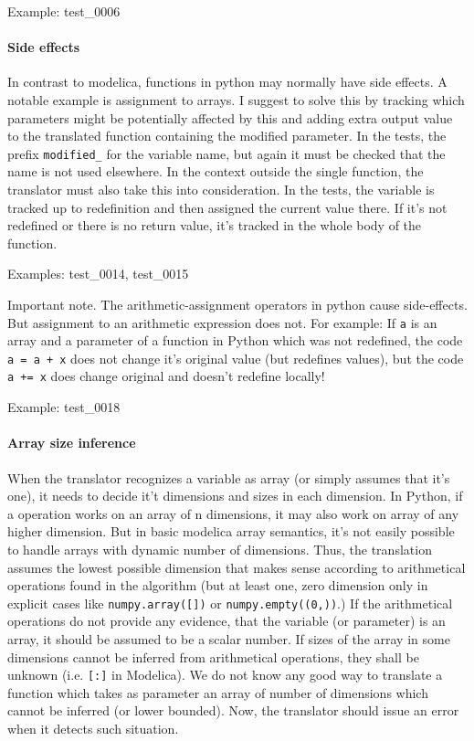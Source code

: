 \documentclass[a4paper,10pt]{article}
\begin{document}
Example: test\_0006

\paragraph{Side effects}
In contrast to modelica, functions in python may normally have side effects. A notable example is assignment to arrays.
I suggest to solve this by tracking which parameters might be potentially affected by this and adding extra
output value to the translated function containing the modified parameter.
In the tests, the prefix {\tt modified\_} for the variable name, but again it must be checked that the name is not used
elsewhere.
In the context outside the single function, the translator must also take this into consideration.
In the tests, the variable is tracked up to redefinition and then assigned the current value there. If it's not redefined
or there is no return value, it's tracked in the whole body of the function.

Examples: test\_0014, test\_0015

Important note. The arithmetic-assignment operators in python cause side-effects. But assignment to an arithmetic expression
does not. For example:
If {\tt a} is an array and a parameter of a function in Python which was not redefined, the code {\tt a = a + x} does not
change it's original value (but redefines values), but the code {\tt a += x} does change original and doesn't redefine locally!

Example: test\_0018


\paragraph{Array size inference}
When the translator recognizes a variable as array (or simply assumes that it's one), it needs to decide it't dimensions 
and sizes in each dimension. In Python, if a operation works on an array of n dimensions, it may also work on array 
of any higher dimension. But in basic modelica array semantics, it's not easily possible to handle arrays with dynamic
number of dimensions. Thus, the translation assumes the lowest possible dimension that makes sense according to 
arithmetical operations found in the algorithm (but at least one, zero dimension only in explicit cases like
{\tt numpy.array([])} or {\tt numpy.empty((0,))}.) If the arithmetical operations do not provide any evidence, that
the variable (or parameter) is an array, it should be assumed to be a scalar number. If sizes of the array in some
dimensions cannot be inferred from arithmetical operations, they shall be unknown (i.e. {\tt [:]} in Modelica). 
We do not know any good way to translate a function which takes as parameter an array of number of dimensions which
cannot be inferred (or lower bounded). Now, the translator should issue an error when it detects such situation.
\end{document}
